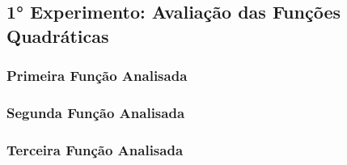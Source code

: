 \subsection{1° Experimento: Avaliação das Funções Quadráticas}
    \subsubsection{Primeira Função Analisada}
    \subsubsection{Segunda Função Analisada}
    \subsubsection{Terceira Função Analisada}